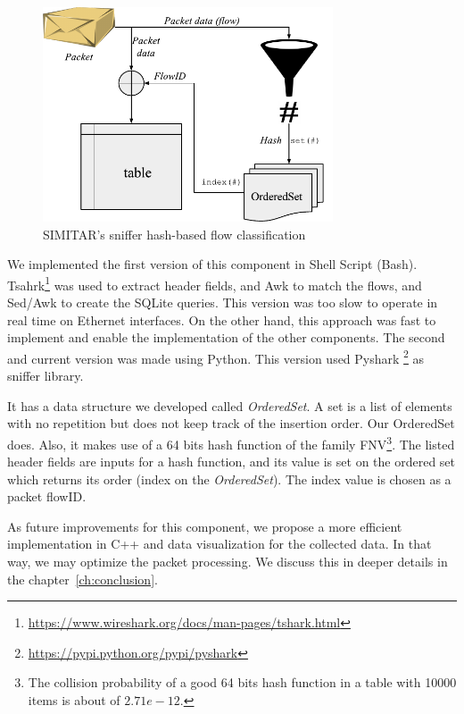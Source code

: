 \begin{figure}[ht!]
        \centering
        \includegraphics[height=2.5in]{figures/ch3/sniffer-classifier}
        \caption{SIMITAR's sniffer hash-based flow classification}
    \label{fig:sniffer}
\end{figure}


We implemented the first version of this component in Shell Script (Bash).  Tsahrk\footnote{\href{https://www.wireshark.org/docs/man-pages/tshark.html}{https://www.wireshark.org/docs/man-pages/tshark.html}} was used to extract header fields, and Awk to match the flows, and Sed/Awk to create the SQLite queries. This version was too slow to operate in real time on Ethernet interfaces. On the other hand, this approach was fast to implement and enable the implementation of the other components. The second and current version was made using Python. This version used Pyshark \footnote{\href{https://pypi.python.org/pypi/pyshark}{https://pypi.python.org/pypi/pyshark}} as sniffer library.  


It has a data structure we developed called \textit{OrderedSet}. A set is a list of elements with no repetition but does not keep track of the insertion order. Our OrderedSet does. Also, it makes use of a  64 bits hash function of the family FNV\footnote{The collision probability of a good 64 bits hash function in a table with 10000 items is about of $2.71e-12$.}. The listed header fields are inputs for a hash function, and its value is set on the ordered set which returns its order (index on the \textit{OrderedSet}). The index value is chosen as a packet flowID.  


As future improvements for this component, we propose a more efficient implementation in C++ and data visualization for the collected data. In that way, we may optimize the packet processing. We discuss this in deeper details in the chapter~\ref{ch:conclusion}.


